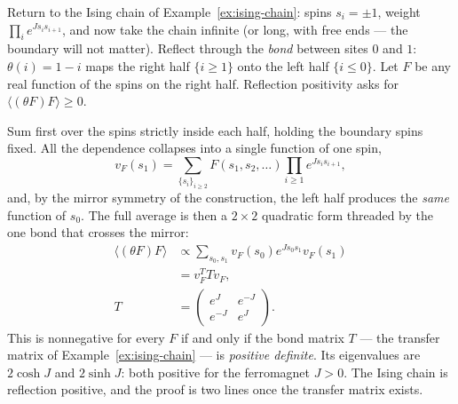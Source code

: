 \begin{eexample}
\label{ex:lattice-rp}
Return to the Ising chain of Example~\ref{ex:ising-chain}: spins $s_i = \pm1$,
weight $\prod_i e^{J s_i s_{i+1}}$, and now take the chain infinite (or long,
with free ends --- the boundary will not matter). Reflect through the
\emph{bond} between sites $0$ and $1$: $\theta(i) = 1 - i$ maps the right half
$\{i \ge 1\}$ onto the left half $\{i \le 0\}$. Let $F$ be any real function of
the spins on the right half. Reflection positivity asks for $\langle
(\theta F) F\rangle \ge 0$.

Sum first over the spins strictly inside each half, holding the boundary spins
fixed. All the dependence collapses into a single function of one spin,
\begin{equation}
v_F(s_1) = \sum_{\{s_i\}_{i \ge 2}} F(s_1, s_2, \dots)
\prod_{i \ge 1} e^{J s_i s_{i+1}},
\end{equation}
and, by the mirror symmetry of the construction, the left half produces the
\emph{same} function of $s_0$. The full average is then a $2\times2$ quadratic
form threaded by the one bond that crosses the mirror:
\begin{equation}
\begin{aligned}
\langle (\theta F) F \rangle
&\propto \sum_{s_0, s_1} v_F(s_0) e^{J s_0 s_1} v_F(s_1)\\
&= v_F^{T} T v_F,\\
T &= \begin{pmatrix} e^J & e^{-J} \\ e^{-J} & e^{J}\end{pmatrix}.
\end{aligned}
\label{eq:rp-transfer}
\end{equation}
This is nonnegative for every $F$ if and only if the bond matrix $T$ ---
the transfer matrix of Example~\ref{ex:ising-chain} --- is \emph{positive
definite}. Its eigenvalues are $2\cosh J$ and $2\sinh J$: both positive for
the ferromagnet $J > 0$. The Ising chain is reflection positive, and the proof
is two lines once the transfer matrix exists.


\end{eexample}
